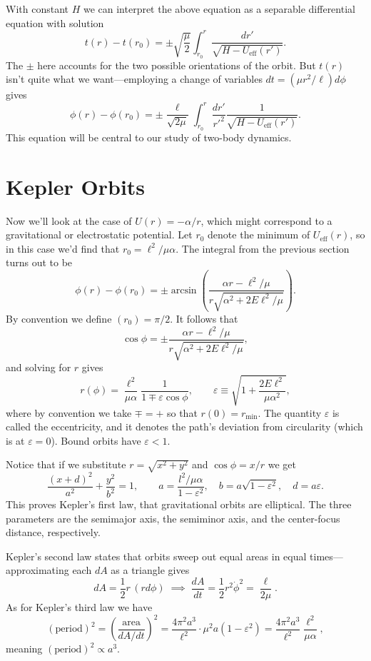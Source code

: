 \documentclass[../p111main.tex]{subfiles}
\begin{document}
With constant $H$ we can interpret the above equation as a separable differential equation with solution
\[ t(r) - t(r_0) = \pm \sqrt{\frac{\mu}{2}} \int_{r_0}^{r} \frac{dr'}{\sqrt{H - U_\textrm{eff}(r')}}. \]
The $\pm$ here accounts for the two possible orientations of the orbit.
But $t(r)$ isn't quite what we want---employing a change of variables $dt = (\mu r^2 / \ell) d\phi$ gives
\[ \phi(r) - \phi(r_0) = \pm \frac{\ell}{\sqrt{2\mu}} \int_{r_0}^{r} \frac{dr'}{r'^2} \frac{1}{\sqrt{H - U_\textrm{eff}(r')}}. \]
This equation will be central to our study of two-body dynamics.

\section{Kepler Orbits}
Now we'll look at the case of $U(r) = -\alpha / r$, which might correspond to a gravitational or electrostatic potential.
Let $r_0$ denote the minimum of $U_\textrm{eff}(r)$, so in this case we'd find that $r_0 = \ell^2 / \mu \alpha$.
The integral from the previous section turns out to be
\[ \phi(r) - \phi(r_0) = \pm \arcsin \left( \frac{\alpha r - \ell^2 / \mu}{r \sqrt{\alpha^2 + 2E \ell^2 / \mu}} \right). \]
By convention we define $(r_0) = \pi / 2$.
It follows that
\[ \cos \phi = \pm \frac{\alpha r - \ell^2 / \mu}{r \sqrt{\alpha^2 + 2 E \ell^2 / \mu}}, \]
and solving for $r$ gives
\[ r(\phi) = \frac{\ell^2}{\mu \alpha} \frac{1}{1 \mp \varepsilon \cos \phi}, \qquad \varepsilon \equiv \sqrt{1 + \frac{2E\ell^2}{\mu \alpha^2}}, \]
where by convention we take $\mp = +$ so that $r(0) = r_\textrm{min}$.
The quantity $\varepsilon$ is called the eccentricity, and it denotes the path's deviation from circularity (which is at $\varepsilon = 0$).
Bound orbits have $\varepsilon < 1$.

Notice that if we substitute $r = \sqrt{x^2 + y^2}$ and $\cos \phi = x / r$ we get
\[ \frac{(x+d)^2}{a^2} + \frac{y^2}{b^2} = 1, \qquad a = \frac{l^2 / \mu \alpha}{1 - \varepsilon^2}, \quad b = a \sqrt{1 - \varepsilon^2}, \quad d = a\varepsilon. \]
This proves Kepler's first law, that gravitational orbits are elliptical.
The three parameters are the semimajor axis, the semiminor axis, and the center-focus distance, respectively.

Kepler's second law states that orbits sweep out equal areas in equal times---approximating each $dA$ as a triangle gives
\[ dA = \frac{1}{2} r \, (r d\phi) \;\implies\; \frac{dA}{dt} = \frac{1}{2} r^2 \dot \phi^2 = \frac{\ell}{2\mu}. \]
As for Kepler's third law we have
\[ (\textrm{period})^2 = \left( \frac{\textrm{area}}{dA / dt} \right)^2 = \frac{4\pi^2 a^3}{\ell^2} \cdot \mu^2 a(1 - \varepsilon^2) = \frac{4\pi^2 a^3}{\ell^2} \frac{\ell^2}{\mu \alpha}, \]
meaning $(\textrm{period})^2 \propto a^3$.
\end{document}
